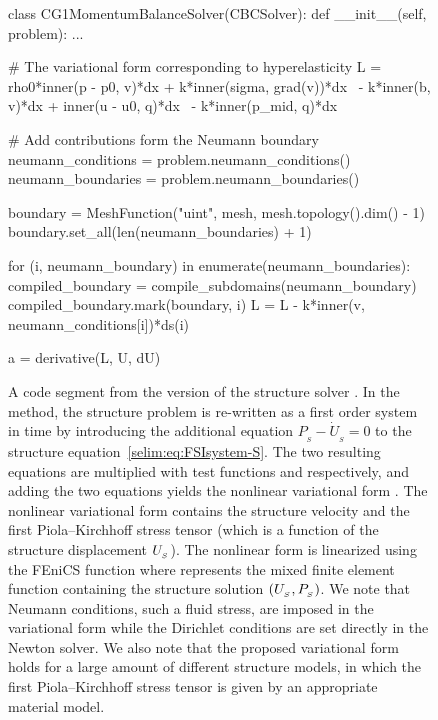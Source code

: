 \begin{figure}
\bwfig
\begin{python}
class CG1MomentumBalanceSolver(CBCSolver):
    def __init__(self, problem):
        ...

        # The variational form corresponding to hyperelasticity
        L = rho0*inner(p - p0, v)*dx + k*inner(sigma, grad(v))*dx \
          - k*inner(b, v)*dx + inner(u - u0, q)*dx \
          - k*inner(p_mid, q)*dx

        # Add contributions form the Neumann boundary
        neumann_conditions = problem.neumann_conditions()
        neumann_boundaries = problem.neumann_boundaries()

        boundary = MeshFunction("uint", mesh, mesh.topology().dim() - 1)
        boundary.set_all(len(neumann_boundaries) + 1)

        for (i, neumann_boundary) in enumerate(neumann_boundaries):
            compiled_boundary = compile_subdomains(neumann_boundary)
            compiled_boundary.mark(boundary, i)
            L = L - k*inner(v, neumann_conditions[i])*ds(i)

        a = derivative(L, U, dU)
\end{python}
\caption{A code segment from the \cgone{} version of the structure
  solver . In the \cgone{} method, the structure problem
  is re-written as a first order system in time by introducing the
  additional equation $P_{_{S}} - \dot{U}_{_{S}} = 0$ to the structure
  equation~\eqref{selim:eq:FSIsystem-S}. The two resulting
  equations are multiplied with test functions \emp{v} and \emp{q}
  respectively, and adding the two equations yields the nonlinear
  variational form \emp{L}. The nonlinear variational form 
  contains the structure velocity \emp{p} and the first
  Piola--Kirchhoff stress tensor \emp{sigma} (which is a function of
  the structure displacement $U_{_{S}}$).  The nonlinear form \emp{L} is
  linearized using the FEniCS function \emp{derivative} where \emp{U}
  represents the mixed finite element function containing the structure
  solution $(U_{_{S}}, P_{_{S}})$.  We note that Neumann conditions, such a
  fluid stress, are imposed in the variational form \emp{L} while the
  Dirichlet conditions are set directly in the Newton solver. We also
  note that the proposed variational form holds for a large amount of
  different structure models, in which the first Piola--Kirchhoff stress
  tensor \emp{sigma} is given by an appropriate material model.  }
\label{selim:fig:structuresolver}
\end{figure}

